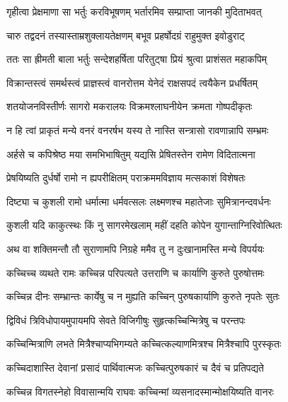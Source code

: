 \twolineshloka
{गृहीत्वा प्रेक्षमाणा सा भर्तुः करविभूषणम्}
{भर्तारमिव सम्प्राप्ता जानकी मुदिताभवत्} %

\twolineshloka
{चारु तद्वदनं तस्यास्ताम्रशुक्लायतेक्षणम्}
{बभूव प्रहर्षोदग्रं राहुमुक्त इवोडुराट्} %

\twolineshloka
{ततः सा ह्रीमती बाला भर्तुः सन्देशहर्षिता}
{परितुट्षा प्रियं श्रुत्वा प्राशंसत महाकपिम्} %

\twolineshloka
{विक्रान्तस्त्वं समर्थस्त्वं प्राज्ञस्त्वं वानरोत्तम}
{येनेदं राक्षसपदं त्वयैकेन प्रधर्षितम्} %

\twolineshloka
{शतयोजनविस्तीर्णः सागरो मकरालयः}
{विक्रमश्लाघनीयेन क्रमता गोष्पदीकृतः} %

\twolineshloka
{न हि त्वां प्राकृतं मन्ये वनरं वनरर्षभ}
{यस्य ते नास्ति सन्त्रासो रावणान्नापि सम्भ्रमः} %

\twolineshloka
{अर्हसे च कपिश्रेष्ठ मया समभिभाषितुम्}
{यद्यसि प्रेषितस्तेन रामेण विदितात्मना} %

\twolineshloka
{प्रेषयिष्यति दुर्धर्षो रामो न ह्यपरीक्षितम्}
{पराक्रममविज्ञाय मत्सकाशं विशेषतः} %

\twolineshloka
{दिष्ट्या च कुशली रामो धर्मात्मा धर्मवत्सलः}
{लक्ष्मणश्च महातेजाः सुमित्रानन्दवर्धनः} %

\twolineshloka
{कुशली यदि काकुत्स्थः किं नु सागरमेखलाम्}
{महीं दहति कोपेन युगान्ताग्निरिवोत्थितः} %

\twolineshloka
{अथ वा शक्तिमन्तौ तौ सुराणामपि निग्रहे}
{ममैव तु न दुःखानामस्ति मन्ये विपर्ययः} %

\twolineshloka
{कच्चिच्च व्यथते रामः कच्चिन्न परिपत्यते}
{उत्तराणि च कार्याणि कुरुते पुरुषोत्तमः} %

\twolineshloka
{कच्चिन्न दीनः सम्भ्रान्तः कार्येषु च न मुह्यति}
{कच्चिन् पुरुषकार्याणि कुरुते नृपतेः सुतः} %

\twolineshloka
{द्विविधं त्रिविधोपायमुपायमपि सेवते}
{विजिगीषुः सुहृत्कच्चिन्मित्रेषु च परन्तपः} %

\twolineshloka
{कच्चिन्मित्राणि लभते मित्रैश्चाप्यभिगम्यते}
{कच्चित्कल्याणमित्रश्च मित्रैश्चापि पुरस्कृतः} %

\twolineshloka
{कच्चिदाशास्ति देवानां प्रसादं पार्थिवात्मजः}
{कच्चित्पुरुषकारं च दैवं च प्रतिपद्यते} %

\twolineshloka
{कच्चिन्न विगतस्नेहो विवासान्मयि राघवः}
{कच्चिन्मां व्यसनादस्मान्मोक्षयिष्यति वानरः} %

